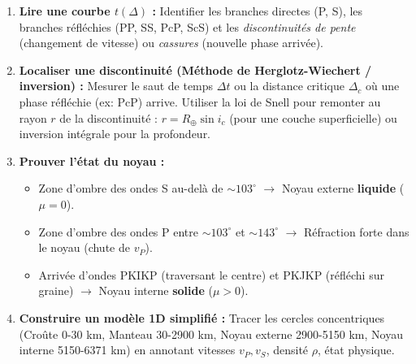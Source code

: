 \documentclass[11pt]{article}
\begin{document}
\begin{bilan}
\begin{enumerate}
    \item \textbf{Lire une courbe $t(\Delta)$ :} Identifier les branches directes (P, S), les branches réfléchies (PP, SS, PcP, ScS) et les \emph{discontinuités de pente} (changement de vitesse) ou \emph{cassures} (nouvelle phase arrivée).
    \item \textbf{Localiser une discontinuité (Méthode de Herglotz-Wiechert / inversion) :} Mesurer le saut de temps $\Delta t$ ou la distance critique $\Delta_c$ où une phase réfléchie (ex: PcP) arrive. Utiliser la loi de Snell pour remonter au rayon $r$ de la discontinuité : $r = R_{\oplus} \sin i_c$ (pour une couche superficielle) ou inversion intégrale pour la profondeur.
    \item \textbf{Prouver l'état du noyau :}
    \begin{itemize}
        \item Zone d'ombre des ondes S au-delà de $\sim 103^\circ$ $\rightarrow$ Noyau externe \textbf{liquide} ($\mu=0$).
        \item Zone d'ombre des ondes P entre $\sim 103^\circ$ et $\sim 143^\circ$ $\rightarrow$ Réfraction forte dans le noyau (chute de $v_P$).
        \item Arrivée d'ondes PKIKP (traversant le centre) et PKJKP (réfléchi sur graine) $\rightarrow$ Noyau interne \textbf{solide} ($\mu>0$).
    \end{itemize}
    \item \textbf{Construire un modèle 1D simplifié :} Tracer les cercles concentriques (Croûte 0-30 km, Manteau 30-2900 km, Noyau externe 2900-5150 km, Noyau interne 5150-6371 km) en annotant vitesses $v_P, v_S$, densité $\rho$, état physique.
\end{enumerate}

\end{bilan}
\end{document}
